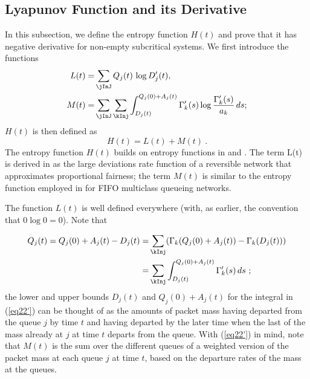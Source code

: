 \documentclass{amsart}
\newtheorem{remark}{Remark}
\begin{document}
\iffalse
\begin{remark}
As in Section \ref{Model}, we employ here the convention that $\sigma_j(\vecQ)=0$ whenever $Q_j=0$.  However, there may be other optimal solutions to this optimization. In particular, it is important to note that, $D'_j(t)$ solves the proportional fair optimization \eqref{PFOpt} but, in general, $D'_j(t)=0$ need not hold when $Q_j(t)=0$. In other words, an empty queue may still be processing work in our fluid model.
\end{remark}
\fi
\subsection{Lyapunov Function and its Derivative}\label{LyaDeriv}

In this subsection, we define the entropy function $H(t)$ and prove that it has negative derivative for non-empty subcritical systems.
We first introduce the functions
\begin{align}
L(t) = 
& \sum_{\jInJ} Q_j(t) \, \log D'_j(t) \label{def:L.fun},  \\
M(t) = 
& \sum_\jInJ \sum_\kInj 
  \int_{D_j(t)}^{Q_j(0)+A_j(t)}
    \Gamma'_k(s) \log \frac{\Gamma'_k(s)}{a_{k}} \, ds \label{def:M.fun};
\end{align}
$H(t)$ is then defined as
\begin{equation}\label{def:entropy}
H(t) 
 = L(t) + M(t) \ .
\end{equation}
The entropy function $H(t)$ builds on entropy functions in \cite{Ma07} and \cite{Br96a}.
The term L(t) is derived in \cite{Ma07} as the large deviations rate function of a reversible network that approximates proportional fairness; the term 
$M(t)$ is similar to the entropy function employed in \cite{Br96a} for FIFO 
multiclass queueing networks.

The function  $L(t)$ is well defined everywhere (with, as earlier, the convention
 that $0 \log 0 = 0$).  Note that  
 
\begin{equation}
\label{eq22'}
\begin{split}
Q_j(t)  =  Q_j(0) + A_j(t) - D_j(t) 
=  &\sum_\kInj (\Gamma_k(Q_j(0) +A_j(t)) - \Gamma_k(D_j(t))) \\ 
=  &\sum_\kInj \int_{D_j(t)}^{Q_j(0)+A_j(t)} \Gamma'_k(s) \, ds
\ ;
\end{split}
\end{equation}
the lower and upper bounds $D_j(t)$ and $Q_j(0)+A_j(t)$ for the integral in (\ref{eq22'}) can be thought of as the amounts of packet mass having departed from the queue $j$ by time $t$ and having departed by the later time when the last of the mass already at $j$ at time $t$ departs from the queue.  With (\ref{eq22'}) in mind, note that $M(t)$ is the sum over the different queues of a weighted version of the packet mass at each queue $j$ at time $t$, based on the departure rates of the mass at the queues.
\end{document}

